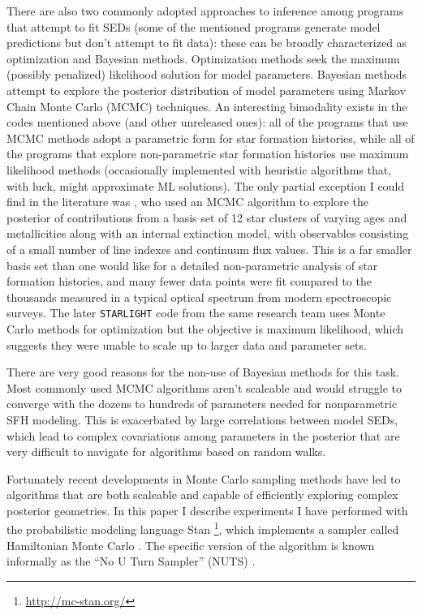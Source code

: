 \documentclass[modern]{aastex62}
\begin{document}
There are also two commonly adopted approaches to inference among programs that attempt to fit SEDs (some of the mentioned programs generate model predictions but don't attempt to fit data): these can be broadly characterized as optimization and Bayesian methods. Optimization methods seek the maximum (possibly penalized) likelihood solution for model parameters. Bayesian methods attempt to explore the posterior distribution of model parameters using Markov Chain Monte Carlo (MCMC) techniques. An interesting bimodality exists in the codes mentioned above (and other unreleased ones): all of the programs that use MCMC methods adopt a parametric form for star formation histories, while all of the programs that explore non-parametric star formation histories use maximum likelihood methods (occasionally implemented with heuristic algorithms that, with luck, might approximate ML solutions). The only partial exception I could find in the literature was \citet{2001MNRAS.325...60C}, who used an MCMC algorithm to explore the posterior of contributions from a basis set of 12 star clusters of varying ages and metallicities along with an internal extinction model, with observables consisting of a small number of line indexes and continuum flux values. This is a far smaller basis set than one would like for a detailed non-parametric analysis of star formation histories, and many fewer data points were fit compared to the thousands measured in a typical optical spectrum from modern spectroscopic surveys. The later \texttt{STARLIGHT} code from the same research team uses Monte Carlo methods for optimization but the objective is maximum likelihood, which suggests they were unable to scale up to larger data and parameter sets.

There are very good reasons for the non-use of Bayesian methods for this task. Most commonly used MCMC algorithms aren't scaleable \citep{2017arXiv170102434B} and would struggle to converge with the dozens to hundreds of parameters needed for nonparametric SFH modeling. This is exacerbated by large correlations between model SEDs, which lead to complex covariations among parameters in the posterior that are very difficult to navigate for algorithms based on random walks.

Fortunately recent developments in Monte Carlo sampling methods have led to algorithms that are both scaleable and capable of efficiently exploring complex posterior geometries. In this paper I describe experiments I have performed with the probabilistic modeling language Stan \citep{stanlang}\footnote{\url{http://mc-stan.org/}}, which implements a sampler called Hamiltonian Monte Carlo \citep[HMC][]{JSSv076i01}. The specific version of the algorithm is known informally as the ``No U Turn Sampler'' (NUTS) \citep{JMLR:v15:hoffman14a}.
\end{document}
